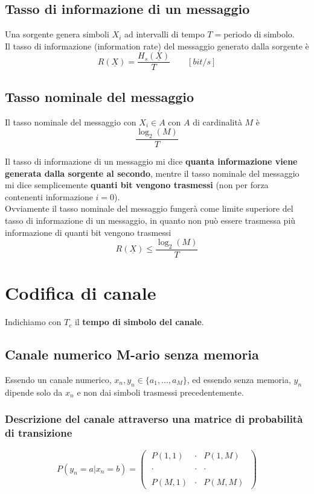 \documentclass{article}
\begin{document}
\subsection{Tasso di informazione di un messaggio}
Una sorgente genera simboli $X_i$ ad intervalli di tempo $T=$periodo di simbolo.\\
Il tasso di informazione (information rate) del messaggio generato dalla sorgente è $$R(\underline{X})=\frac{H_s(\underline{X})}{T}\qquad[bit/s]$$

\subsection{Tasso nominale del messaggio}
Il tasso nominale del messaggio con $X_i\in A$ con $A$ di cardinalità $M$ è $$\frac{\log_2(M)}{T}$$

Il tasso di informazione di un messaggio mi dice \textbf{quanta informazione viene generata dalla sorgente al secondo}, mentre il tasso nominale del messaggio mi dice semplicemente \textbf{quanti bit vengono trasmessi} (non per forza contenenti informazione $i=0$).\\
Ovviamente il tasso nominale del messaggio fungerà come limite superiore del tasso di informazione di un messaggio, in quanto non può essere trasmessa più informazione di quanti bit vengono trasmessi
$$R(\underline{X})\leq \frac{\log_2(M)}{T}$$








\newpage
\section{Codifica di canale}
Indichiamo con $T_c$ il \textbf{tempo di simbolo del canale}.

\subsection{Canale numerico M-ario senza memoria}
Essendo un canale numerico, $x_n, y_n\in\{a_1,...,a_M\}$, ed essendo senza memoria, $y_n$ dipende solo da $x_n$ e non dai simboli trasmessi precedentemente.\\

\subsubsection{Descrizione del canale attraverso una matrice di probabilità di transizione}
$$P(y_n=a|x_n=b)=\left(\;\begin{array}{ccc}
	P(1,1)&\cdot&P(1,M)\\\\
	\cdot&\cdot&\cdot\\\\
	P(M,1)&\cdot&P(M,M)
\end{array}\;\right)$$
\end{document}
